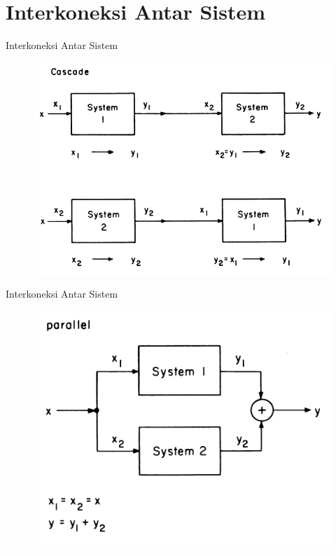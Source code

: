 \documentclass[pdflatex,compress,mathserif]{beamer}
\begin{document}
\section{Interkoneksi Antar Sistem}
\begin{frame}{Interkoneksi Antar Sistem}
	\begin{figure}
		\centering
		\includegraphics[height=0.8\textheight]{img/02.slide_10}
	\end{figure}
\end{frame}

\begin{frame}{Interkoneksi Antar Sistem}
	\begin{figure}
		\centering
		\includegraphics[height=0.8\textheight]{img/02.slide_11}
	\end{figure}
\end{frame}
\end{document}

